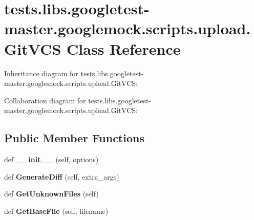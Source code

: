 \hypertarget{classtests_1_1libs_1_1googletest-master_1_1googlemock_1_1scripts_1_1upload_1_1GitVCS}{}\section{tests.\+libs.\+googletest-\/master.googlemock.\+scripts.\+upload.\+Git\+V\+CS Class Reference}
\label{classtests_1_1libs_1_1googletest-master_1_1googlemock_1_1scripts_1_1upload_1_1GitVCS}


Inheritance diagram for tests.\+libs.\+googletest-\/master.googlemock.\+scripts.\+upload.\+Git\+V\+CS\+:


Collaboration diagram for tests.\+libs.\+googletest-\/master.googlemock.\+scripts.\+upload.\+Git\+V\+CS\+:
\subsection*{Public Member Functions}
\begin{DoxyCompactItemize}
\item 
\mbox{\label{classtests_1_1libs_1_1googletest-master_1_1googlemock_1_1scripts_1_1upload_1_1GitVCS_ad0802f3f75eee9a79e6f6bdbcad1e9d0}} 
def {\bfseries \+\_\+\+\_\+init\+\_\+\+\_\+} (self, options)
\item 
\mbox{\label{classtests_1_1libs_1_1googletest-master_1_1googlemock_1_1scripts_1_1upload_1_1GitVCS_a3bd72a544392bf703a64a3564ecf2fa0}} 
def {\bfseries Generate\+Diff} (self, extra\+\_\+args)
\item 
\mbox{\label{classtests_1_1libs_1_1googletest-master_1_1googlemock_1_1scripts_1_1upload_1_1GitVCS_a846d2e2b8ed694dde0e60ef7c24abb21}} 
def {\bfseries Get\+Unknown\+Files} (self)
\item 
\mbox{\label{classtests_1_1libs_1_1googletest-master_1_1googlemock_1_1scripts_1_1upload_1_1GitVCS_afe8c87e3ba1f6c82e77df5fb2efddebb}} 
def {\bfseries Get\+Base\+File} (self, filename)
\end{DoxyCompactItemize}
